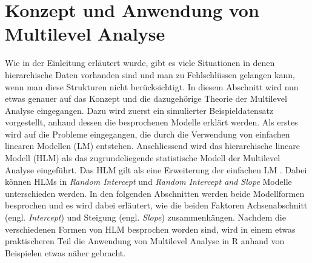 \documentclass[12pt]{article}\usepackage[]{graphicx}\usepackage[]{color}
\begin{document}
\section{Konzept und Anwendung von Multilevel Analyse}
Wie in der Einleitung erläutert wurde, gibt es viele Situationen in denen hierarchische Daten vorhanden sind und man zu Fehlschlüssen gelangen kann, wenn man diese Strukturen nicht berücksichtigt. In diesem Abschnitt wird nun etwas genauer auf das Konzept und die dazugehörige Theorie der Multilevel Analyse eingegangen. Dazu wird zuerst ein simulierter Beispieldatensatz vorgestellt, anhand dessen die besprochenen Modelle erklärt werden. Als erstes wird auf die Probleme eingegangen, die durch die Verwendung von einfachen linearen Modellen (LM) entstehen. Anschliessend wird das hierarchische lineare Modell (HLM) als das zugrundeliegende statistische Modell der Multilevel Analyse eingeführt. Das HLM gilt als eine Erweiterung der einfachen LM \citep{SnijdersTomA.B2012Ma:a}. Dabei können HLMs in \textit{Random Intercept} und \textit{Random Intercept and Slope} Modelle unterschieden werden. In den folgenden Abschnitten werden beide Modellformen besprochen und es wird dabei erläutert, wie die beiden Faktoren Achsenabschnitt (engl. \textit{Intercept}) und Steigung (engl. \textit{Slope}) zusammenhängen. Nachdem die verschiedenen Formen von HLM besprochen worden sind, wird in einem etwas praktischeren Teil die Anwendung von Multilevel Analyse in R anhand von Beispielen etwas näher gebracht.
\end{document}
